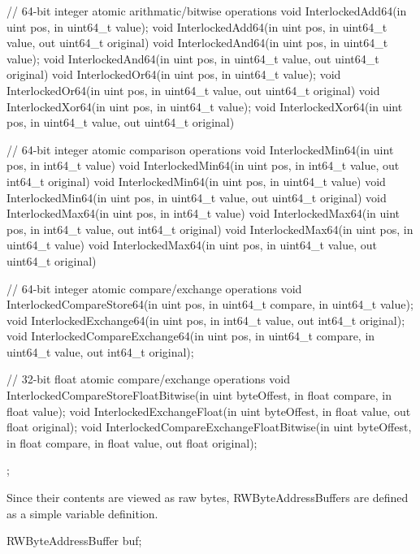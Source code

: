 \begin{HLSL}
{   // 64-bit integer atomic arithmatic/bitwise operations
   void InterlockedAdd64(in uint pos, in uint64_t value);
   void InterlockedAdd64(in uint pos, in uint64_t value, out uint64_t original)
   void InterlockedAnd64(in uint pos, in uint64_t value);
   void InterlockedAnd64(in uint pos, in uint64_t value, out uint64_t original)
   void InterlockedOr64(in uint pos, in uint64_t value);
   void InterlockedOr64(in uint pos, in uint64_t value, out uint64_t original)
   void InterlockedXor64(in uint pos, in uint64_t value);
   void InterlockedXor64(in uint pos, in uint64_t value, out uint64_t original)

   // 64-bit integer atomic comparison operations
   void InterlockedMin64(in uint pos, in int64_t value)
   void InterlockedMin64(in uint pos, in int64_t value, out int64_t original)
   void InterlockedMin64(in uint pos, in uint64_t value)
   void InterlockedMin64(in uint pos, in uint64_t value, out uint64_t original)
   void InterlockedMax64(in uint pos, in int64_t value)
   void InterlockedMax64(in uint pos, in int64_t value, out int64_t original)
   void InterlockedMax64(in uint pos, in uint64_t value)
   void InterlockedMax64(in uint pos, in uint64_t value, out uint64_t original)

   // 64-bit integer atomic compare/exchange operations
   void InterlockedCompareStore64(in uint pos, in uint64_t compare, in uint64_t value);
   void InterlockedExchange64(in uint pos, in int64_t value, out int64_t original);
   void InterlockedCompareExchange64(in uint pos, in uint64_t compare,
                                      in uint64_t value, out int64_t original);

   // 32-bit float atomic compare/exchange operations
   void InterlockedCompareStoreFloatBitwise(in uint byteOffest,
                                             in float compare, in float value);
   void InterlockedExchangeFloat(in uint byteOffest, in float value,
                                  out float original);
   void InterlockedCompareExchangeFloatBitwise(in uint byteOffest,
                                                in float compare,
                                                in float value,
                                                out float original);
};
\end{HLSL}


Since their contents are viewed as raw bytes, RWByteAddressBuffers are defined as a simple variable definition.
\begin{HLSL}
  RWByteAddressBuffer buf;
\end{HLSL}

